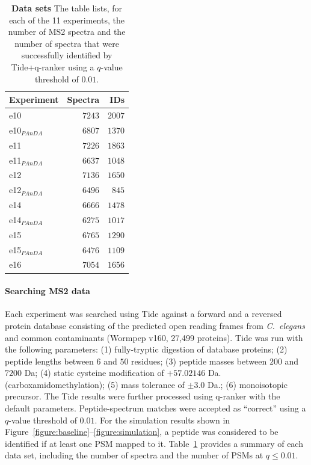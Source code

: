 \documentclass[12pt]{article}
\newcommand{\panda}{\ensuremath{_{PAnDA}}}
\begin{document}
\begin{table}
\centering
\small
\begin{tabular}{lrr}
Experiment & Spectra & IDs \\
\hline
e10 & $7243$ & $2007$ \\
e10\panda & $6807$ & $1370$ \\
e11 & $7226$ & $1863$ \\
e11\panda & $6637$ & $1048$ \\
e12 & $7136$ & $1650$ \\
e12\panda & $6496$ & $845$ \\
e14 & $6666$ & $1478$ \\
e14\panda & $6275$ & $1017$ \\   
e15 & $6765$ & $1290$ \\         
e15\panda & $6476$ & $1109$ \\   
e16 & $7054$ & $1656$ \\         
\end{tabular}
\caption{{\bf Data sets}  The table lists, for each of the 11 experiments, the number of MS2 spectra and the number of spectra that were successfully identified by Tide+q-ranker using a $q$-value threshold of $0.01$.
\label{table:data}}
\end{table}

\paragraph{Searching MS2 data}
Each experiment was searched using Tide \cite{diament:faster} against
a forward and a reversed protein database consisting of the predicted
open reading frames from {\it C.\ elegans} and common contaminants
(Wormpep v160, 27,499 proteins). Tide was run with the following
parameters: (1) fully-tryptic digestion of database proteins; (2)
peptide lengths between $6$ and $50$ residues; (3) peptide masses
between $200$ and $7200$ Da; (4) static cysteine modification of
$+57.02146$ Da. (carboxamidomethylation); (5) mass tolerance of $\pm
3.0$ Da.; (6) monoisotopic precursor.  The Tide results were further
processed using q-ranker \cite{spivak:improvements} with the default
parameters.  Peptide-spectrum matches were accepted as ``correct''
using a $q$-value threshold of $0.01$.  For the simulation results
shown in Figure~\ref{figure:baseline}--\ref{figure:simulation}, a
peptide was considered to be identified if at least one PSM mapped to
it.  Table~\ref{table:data} provides a summary of each data set,
including the number of spectra and the number of PSMs at $q\leq
0.01$.
\end{document}
